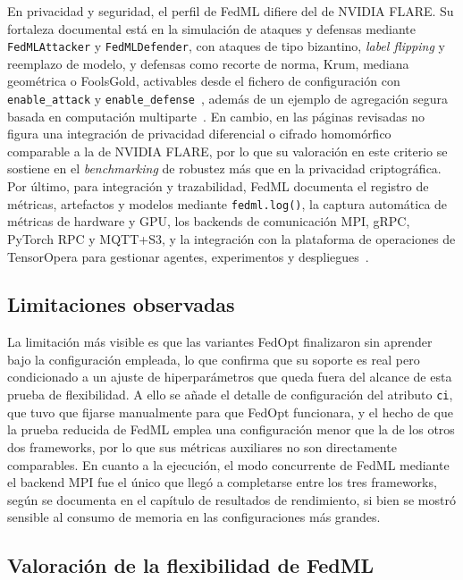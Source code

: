 En privacidad y seguridad, el perfil de FedML difiere del de NVIDIA FLARE. Su
fortaleza documental está en la simulación de ataques y defensas mediante
\texttt{FedMLAttacker} y \texttt{FedMLDefender}, con ataques de tipo bizantino,
\textit{label flipping} y reemplazo de modelo, y defensas como recorte de norma, Krum,
mediana geométrica o FoolsGold, activables desde el fichero de configuración con
\texttt{enable\_attack} y \texttt{enable\_defense}~\parencite{fedmlSecurity}, además de un
ejemplo de agregación segura basada en computación multiparte~\parencite{fedmlExamples}.
En cambio, en las páginas revisadas no figura una integración de privacidad diferencial o
cifrado homomórfico comparable a la de NVIDIA FLARE, por lo que su valoración en este
criterio se sostiene en el \textit{benchmarking} de robustez más que en la privacidad
criptográfica. Por último, para integración y trazabilidad, FedML documenta el registro
de métricas, artefactos y modelos mediante \texttt{fedml.log()}, la captura automática de
métricas de hardware y GPU, los backends de comunicación MPI, gRPC, PyTorch RPC y MQTT+S3,
y la integración con la plataforma de operaciones de TensorOpera para gestionar agentes,
experimentos y despliegues~\parencite{fedmlTracking,fedmlExamples}.

\subsection{Limitaciones observadas}\label{subsec:flex-fedml-lim}

La limitación más visible es que las variantes FedOpt finalizaron sin aprender bajo
la configuración empleada, lo que confirma que su soporte es real pero condicionado a
un ajuste de hiperparámetros que queda fuera del alcance de esta prueba de
flexibilidad. A ello se añade el detalle de configuración del atributo \texttt{ci},
que tuvo que fijarse manualmente para que FedOpt funcionara, y el hecho de que la
prueba reducida de FedML emplea una configuración menor que la de los otros dos
frameworks, por lo que sus métricas auxiliares no son directamente comparables. En
cuanto a la ejecución, el modo concurrente de FedML mediante el backend MPI fue el
único que llegó a completarse entre los tres frameworks, según se documenta en el
capítulo de resultados de rendimiento, si bien se mostró sensible al consumo de
memoria en las configuraciones más grandes.

\subsection{Valoración de la flexibilidad de FedML}\label{subsec:flex-fedml-score}

